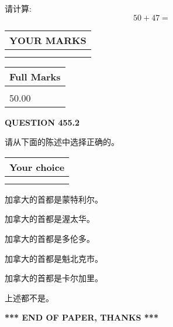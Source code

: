 \documentclass{ctexart}
\begin{document}
  
 
请计算:
\begin{equation}
50 +  %
47 = \nonumber
\end{equation}
 

 

 
  
\vspace{0.2in}
  
\noindent\begin{tabular}{|l|}
\hline
 YOUR MARKS  \\
\hline
 \\ 
 \\ 
\hline
\end{tabular}
\hspace{0.05in} \begin{tabular}{|l|}
\hline
 Full Marks  \\
\hline
 \\ 
50.00 \\
\hline
\end{tabular}
{\textbf{\Large{QUESTION
455.2 
}}}
  
  
请从下面的陈述中选择正确的。
  
  
\noindent\hspace{3.0in} \begin{tabular}{|l|}
\hline
Your choice \\
\hline
 \\ 
 \\ 
\hline
\end{tabular}
  
  
 
 
加拿大的首都是蒙特利尔。
 
 
加拿大的首都是渥太华。
 
 
加拿大的首都是多伦多。
 
 
加拿大的首都是魁北克市。
 
 
加拿大的首都是卡尔加里。
 
 
 上述都不是。
 
 
   
   
 \vspace{0.2in}
 
   
   
   
   
\vspace{1.0in} 
{\textbf{\large{ *** END OF PAPER, THANKS *** }}} 
   
\end{document}
